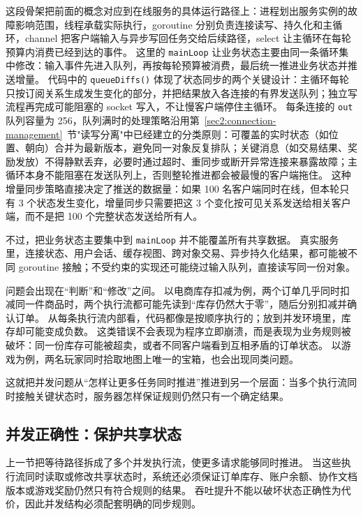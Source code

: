 这段骨架把前面的概念对应到在线服务的具体运行路径上：进程划出服务实例的故障影响范围，线程承载实际执行，goroutine 分别负责连接读写、持久化和主循环，channel 把客户端输入与异步写回任务交给后续路径，select 让主循环在每轮预算内消费已经到达的事件。
这里的 \texttt{mainLoop} 让业务状态主要由同一条循环集中修改：输入事件先进入队列，再按每轮预算被消费，最后统一推进业务状态并推送增量。
代码中的 \texttt{queueDiffs()} 体现了状态同步的两个关键设计：主循环每轮只按订阅关系生成发生变化的部分，并把结果放入各连接的有界发送队列；独立写流程再完成可能阻塞的 socket 写入，不让慢客户端停住主循环。
每条连接的 \texttt{out} 队列容量为 256，队列满时的处理策略沿用第~\ref{sec2:connection-management}~节"读写分离"中已经建立的分类原则：可覆盖的实时状态（如位置、朝向）合并为最新版本，避免同一对象反复排队；关键消息（如交易结果、奖励发放）不得静默丢弃，必要时通过超时、重同步或断开异常连接来暴露故障；主循环本身不能阻塞在发送队列上，否则整轮推进都会被最慢的客户端拖住。
这种增量同步策略直接决定了推送的数据量：如果 100 名客户端同时在线，但本轮只有 3 个状态发生变化，增量同步只需要把这 3 个变化按可见关系发送给相关客户端，而不是把 100 个完整状态发送给所有人。

不过，把业务状态主要集中到 \texttt{mainLoop} 并不能覆盖所有共享数据。
真实服务里，连接状态、用户会话、缓存视图、跨对象交易、异步持久化结果，都可能被不同 goroutine 接触；不受约束的实现还可能绕过输入队列，直接读写同一份对象。

问题会出现在“判断”和“修改”之间。
以电商库存扣减为例，两个订单几乎同时扣减同一件商品时，两个执行流都可能先读到“库存仍然大于零”，随后分别扣减并确认订单。
从每条执行流内部看，代码都像是按顺序执行的；放到并发环境里，库存却可能变成负数。
这类错误不会表现为程序立即崩溃，而是表现为业务规则被破坏：同一份库存可能被超卖，或者不同客户端看到互相矛盾的订单状态。
以游戏为例，两名玩家同时拾取地图上唯一的宝箱，也会出现同类问题。

这就把并发问题从“怎样让更多任务同时推进”推进到另一个层面：当多个执行流同时接触关键状态时，服务器怎样保证规则仍然只有一个确定结果。

\subsection{并发正确性：保护共享状态}\label{sec3:concurrency-correctness}

上一节把等待路径拆成了多个并发执行流，使更多请求能够同时推进。
当这些执行流同时读取或修改共享状态时，系统还必须保证订单库存、账户余额、协作文档版本或游戏奖励仍然只有符合规则的结果。
吞吐提升不能以破坏状态正确性为代价，因此并发结构必须配套明确的同步规则。

